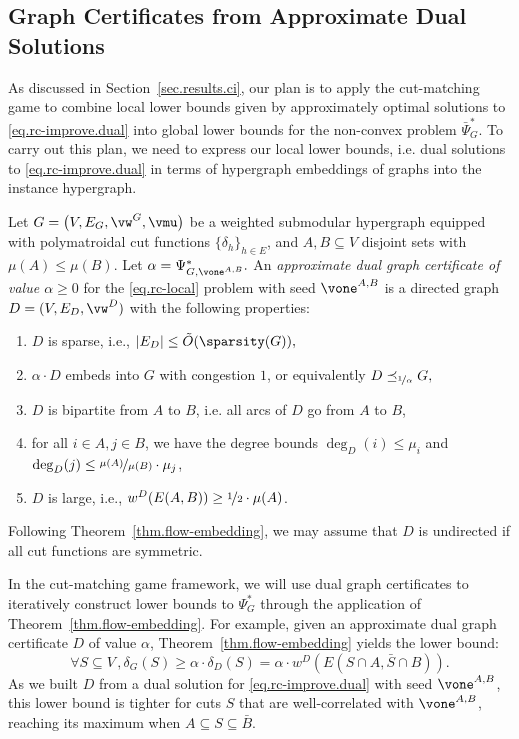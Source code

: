 \documentclass[letterpaper]{article}
\begin{document}
\subsection{Graph Certificates from Approximate Dual Solutions}


As discussed in Section~\ref{sec.results.ci}, our plan is to apply the cut-matching game to combine local lower bounds given by approximately optimal solutions to \eqref{eq.rc-improve.dual} into global lower bounds for the non-convex problem $\bar{\Psi}^*_{G}$.
To carry out this plan, we need to express our local lower bounds, i.e. dual solutions to \eqref{eq.rc-improve.dual} in terms of hypergraph embeddings of graphs into the instance hypergraph.
\begin{definition}
\label{def.graph}
Let $G = \big( V, E_G, \vw^G, \vmu \big)$ be a weighted submodular hypergraph equipped with polymatroidal cut functions $\{\delta_h\}_{h\in E}$, and $A,B \subseteq V$ disjoint sets with $\mu(A) \leq \mu(B).$ Let $\alpha = \Psi^*_{G, \vone^{A,B}}.$
An \emph{approximate dual graph certificate of value $\alpha \geq 0$} for the \eqref{eq.rc-local} problem with seed $\vone^{A,B}$ is a directed graph $D=(V,E_D, \vw^D)$ with the following properties:
\begin{enumerate}
    \item $D$ is sparse, i.e., $|E_D| \leq \tilde{O}(\sparsity(G)),$
    \item $\alpha \cdot D$ embeds into $G$ with congestion $1$, or equivalently $D \preceq_{\nicefrac{1}{\alpha}} G,$
    \item $D$ is bipartite from $A$ to $B$, i.e. all arcs of $D$ go from $A$ to $B$,
    \item for all $i \in A, j \in B$, we have the degree bounds $\deg_D(i) \leq \mu_i$ and $\deg_D(j) \leq \nicefrac{\mu(A)}{\mu(B)} \cdot \mu_j$,
    \item $D$ is large, i.e., $w^D(E(A,B)) \geq \nicefrac{1}{2} \cdot \mu(A)$.
\end{enumerate}
Following Theorem~\ref{thm.flow-embedding}, we may assume that $D$ is undirected if all cut functions are symmetric.
\end{definition}
In the cut-matching game framework, we will use  dual graph certificates to iteratively construct lower bounds to $\Psi^*_G$ through the application of Theorem~\ref{thm.flow-embedding}.
For example, given an approximate dual graph certificate $D$ of value $\alpha$, Theorem~\ref{thm.flow-embedding} yields the lower bound:
$$
\forall S \subseteq V\,, \delta_G(S) \geq \alpha \cdot \delta_D(S) = \alpha \cdot w^D(E(S \cap A, \bar{S} \cap B)).
$$
As we built $D$ from a dual solution for \eqref{eq.rc-improve.dual} with seed $\vone^{A,B}$, this lower bound is tighter for cuts $S$ that are well-correlated with $\vone^{A,B}$, reaching its maximum when $A \subseteq S \subseteq \bar{B}.$
\end{document}
